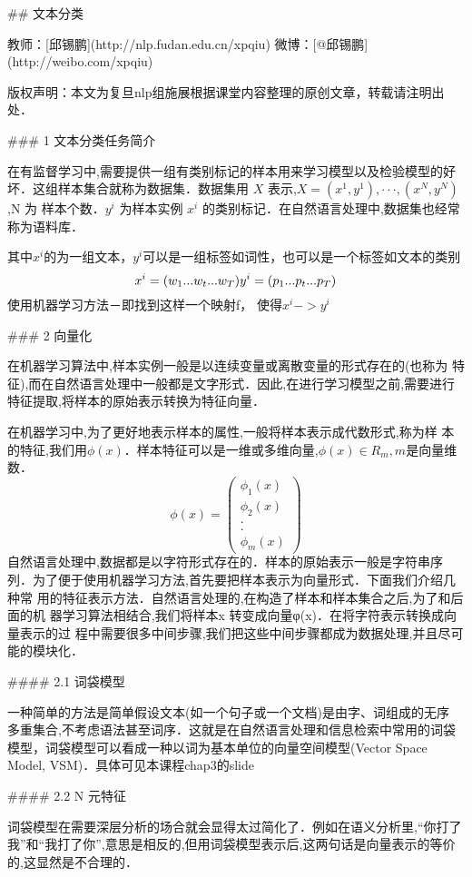 ## 文本分类

教师：[邱锡鹏](http://nlp.fudan.edu.cn/xpqiu)  微博：[@邱锡鹏](http://weibo.com/xpqiu)

版权声明：本文为复旦nlp组施展根据课堂内容整理的原创文章，转载请注明出处．



### 1 文本分类任务简介

​	在有监督学习中,需要提供一组有类别标记的样本用来学习模型以及检验模型的好 坏．这组样本集合就称为数据集．数据集用 $X$ 表示,$X = {(x^1 , y^1 ), · · · , (x^N , y^N )}$,N 为 样本个数．$y^i$ 为样本实例 $x^i$ 的类别标记．在自然语言处理中,数据集也经常称为语料库．

其中$x^i$的为一组文本，$y^i$可以是一组标签如词性，也可以是一个标签如文本的类别
$$
x^i = (w_1...w_t...w_T)\\ 
y^i=(p_1...p_t...p_T)
$$
使用机器学习方法－即找到这样一个映射f， 使得$x^{i}->y^{i}$	

### 2 向量化

​	在机器学习算法中,样本实例一般是以连续变量或离散变量的形式存在的(也称为 特征),而在自然语言处理中一般都是文字形式．因此,在进行学习模型之前,需要进行 特征提取,将样本的原始表示转换为特征向量．

​	在机器学习中,为了更好地表示样本的属性,一般将样本表示成代数形式,称为样 本的特征,我们用$\phi(x)$．样本特征可以是一维或多维向量,$\phi(x) ∈ R_m,m$是向量维数．
$$\phi(x) = \left(\begin{array} {ccc} \phi_1(x) \\ \phi_2 (x) \\ .\\ .\\ \phi_m(x)\end{array}\right)$$
​	自然语言处理中,数据都是以字符形式存在的．样本的原始表示一般是字符串序 列．为了便于使用机器学习方法,首先要把样本表示为向量形式．下面我们介绍几种常 用的特征表示方法．自然语言处理的,在构造了样本和样本集合之后,为了和后面的机 器学习算法相结合,我们将样本x 转变成向量φ(x)．在将字符表示转换成向量表示的过 程中需要很多中间步骤,我们把这些中间步骤都成为数据处理,并且尽可能的模块化．

#### 2.1 词袋模型

​	一种简单的方法是简单假设文本(如一个句子或一个文档)是由字、词组成的无序 多重集合,不考虑语法甚至词序．这就是在自然语言处理和信息检索中常用的词袋模型，词袋模型可以看成一种以词为基本单位的向量空间模型(Vector Space Model, VSM)．具体可见本课程chap3的slide

#### 2.2 N 元特征

​	词袋模型在需要深层分析的场合就会显得太过简化了．例如在语义分析里,“你打了 我”和“我打了你”,意思是相反的,但用词袋模型表示后,这两句话是向量表示的等价 的,这显然是不合理的．

